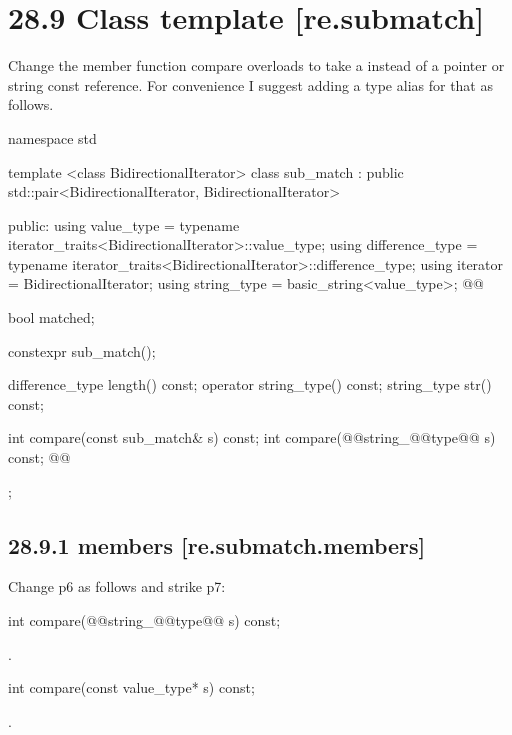 \documentclass[ebook,11pt,article]{memoir}
\begin{document}
\section{28.9 Class template  [re.submatch]}
Change the member function compare overloads to take a  instead of a pointer or string const reference. For convenience I suggest adding a type alias for that as follows.
\begin{codeblock}
namespace std {
  template <class BidirectionalIterator>
  class sub_match : public std::pair<BidirectionalIterator, BidirectionalIterator> {
  public:
     using value_type      =
             typename iterator_traits<BidirectionalIterator>::value_type;
     using difference_type =
             typename iterator_traits<BidirectionalIterator>::difference_type;
     using iterator        = BidirectionalIterator;
     using string_type     = basic_string<value_type>;
     @@

     bool matched;

     constexpr sub_match();

     difference_type length() const;
     operator string_type() const;
     string_type str() const;

     int compare(const sub_match& s) const;
     int compare(@@string_@@type@\del{\&}@ s) const;
     @@
  }; 
}
\end{codeblock}
\subsection{28.9.1  members [re.submatch.members]}
Change p6 as follows and strike p7:

\begin{itemdecl}
int compare(@@string_@@type@\del{\&}@ s) const;
\end{itemdecl}

\begin{itemdescr}
\pnum\returns  {}.
\end{itemdescr}

\begin{removedblock}
\begin{itemdecl}
int compare(const value_type* s) const;
\end{itemdecl}

\begin{itemdescr}
\pnum\returns  {}.
\end{itemdescr}
\end{removedblock}
\end{document}

